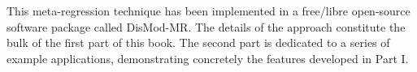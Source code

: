 This meta-regression technique has been implemented in a free/libre
open-source software package called DisMod-MR. The details of the
approach constitute the bulk of the first part of this book.  The
second part is dedicated to a series of example applications,
demonstrating concretely the features developed in Part I.



